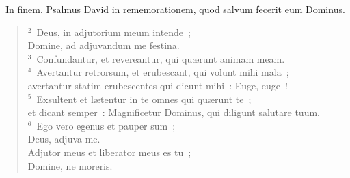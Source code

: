 ~\lettrine[lines=10,image=true,loversize=0.05,lraise=-0.03]{I}{}n finem. Psalmus David in rememorationem, quod salvum fecerit eum Dominus.
\begin{flushleft}\begin{verse}\vspace{6pt}${}^{2}$~Deus, in adjutorium meum intende~;\\ Domine, ad adjuvandum me festina.\\
${}^{3}$~Confundantur, et revereantur, qui qu\ae runt animam meam.\\
${}^{4}$~Avertantur retrorsum, et erubescant, qui volunt mihi mala~;\\ avertantur statim erubescentes qui dicunt mihi~: Euge, euge~!\\
${}^{5}$~Exsultent et l\ae tentur in te omnes qui qu\ae runt te~;\\ et dicant semper~: Magnificetur Dominus, qui diligunt salutare tuum.\\
${}^{6}$~Ego vero egenus et pauper sum~;\\ Deus, adjuva me.\\ Adjutor meus et liberator meus es tu~;\\ Domine, ne moreris.\end{verse}\end{flushleft}


